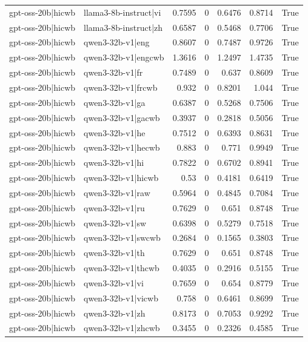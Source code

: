 \begin{table}
\begin{tabular}{l l r r r r l}
gpt-oss-20b|hicwb & llama3-8b-instruct|vi & 0.7595 & 0 & 0.6476 & 0.8714 & True \\
gpt-oss-20b|hicwb & llama3-8b-instruct|zh & 0.6587 & 0 & 0.5468 & 0.7706 & True \\
gpt-oss-20b|hicwb & qwen3-32b-v1|eng & 0.8607 & 0 & 0.7487 & 0.9726 & True \\
gpt-oss-20b|hicwb & qwen3-32b-v1|engcwb & 1.3616 & 0 & 1.2497 & 1.4735 & True \\
gpt-oss-20b|hicwb & qwen3-32b-v1|fr & 0.7489 & 0 & 0.637 & 0.8609 & True \\
gpt-oss-20b|hicwb & qwen3-32b-v1|frcwb & 0.932 & 0 & 0.8201 & 1.044 & True \\
gpt-oss-20b|hicwb & qwen3-32b-v1|ga & 0.6387 & 0 & 0.5268 & 0.7506 & True \\
gpt-oss-20b|hicwb & qwen3-32b-v1|gacwb & 0.3937 & 0 & 0.2818 & 0.5056 & True \\
gpt-oss-20b|hicwb & qwen3-32b-v1|he & 0.7512 & 0 & 0.6393 & 0.8631 & True \\
gpt-oss-20b|hicwb & qwen3-32b-v1|hecwb & 0.883 & 0 & 0.771 & 0.9949 & True \\
gpt-oss-20b|hicwb & qwen3-32b-v1|hi & 0.7822 & 0 & 0.6702 & 0.8941 & True \\
gpt-oss-20b|hicwb & qwen3-32b-v1|hicwb & 0.53 & 0 & 0.4181 & 0.6419 & True \\
gpt-oss-20b|hicwb & qwen3-32b-v1|raw & 0.5964 & 0 & 0.4845 & 0.7084 & True \\
gpt-oss-20b|hicwb & qwen3-32b-v1|ru & 0.7629 & 0 & 0.651 & 0.8748 & True \\
gpt-oss-20b|hicwb & qwen3-32b-v1|sw & 0.6398 & 0 & 0.5279 & 0.7518 & True \\
gpt-oss-20b|hicwb & qwen3-32b-v1|swcwb & 0.2684 & 0 & 0.1565 & 0.3803 & True \\
gpt-oss-20b|hicwb & qwen3-32b-v1|th & 0.7629 & 0 & 0.651 & 0.8748 & True \\
gpt-oss-20b|hicwb & qwen3-32b-v1|thcwb & 0.4035 & 0 & 0.2916 & 0.5155 & True \\
gpt-oss-20b|hicwb & qwen3-32b-v1|vi & 0.7659 & 0 & 0.654 & 0.8779 & True \\
gpt-oss-20b|hicwb & qwen3-32b-v1|vicwb & 0.758 & 0 & 0.6461 & 0.8699 & True \\
gpt-oss-20b|hicwb & qwen3-32b-v1|zh & 0.8173 & 0 & 0.7053 & 0.9292 & True \\
gpt-oss-20b|hicwb & qwen3-32b-v1|zhcwb & 0.3455 & 0 & 0.2326 & 0.4585 & True \\

\end{tabular}
\end{table}
